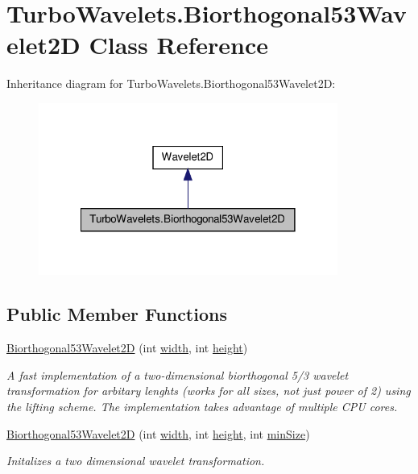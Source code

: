 \hypertarget{class_turbo_wavelets_1_1_biorthogonal53_wavelet2_d}{\section{\-Turbo\-Wavelets.\-Biorthogonal53\-Wavelet2\-D \-Class \-Reference}
\label{class_turbo_wavelets_1_1_biorthogonal53_wavelet2_d}
}


\-Inheritance diagram for \-Turbo\-Wavelets.\-Biorthogonal53\-Wavelet2\-D\-:
\nopagebreak
\begin{figure}[H]
\begin{center}
\leavevmode
\includegraphics[width=278pt]{class_turbo_wavelets_1_1_biorthogonal53_wavelet2_d__inherit__graph}
\end{center}
\end{figure}
\subsection*{\-Public \-Member \-Functions}
\begin{DoxyCompactItemize}
\item 
\hyperlink{class_turbo_wavelets_1_1_biorthogonal53_wavelet2_d_a8783eb5b8e032cd8cf75c5a1bb80bba0}{\-Biorthogonal53\-Wavelet2\-D} (int \hyperlink{class_turbo_wavelets_1_1_wavelet2_d_aaa4b3711957fe1798980e6891331a08d}{width}, int \hyperlink{class_turbo_wavelets_1_1_wavelet2_d_afb2aa87b89b82f329357cbdc0cde18a8}{height})
\begin{DoxyCompactList}\small\item\em \-A fast implementation of a two-\/dimensional biorthogonal 5/3 wavelet transformation for arbitary lenghts (works for all sizes, not just power of 2) using the lifting scheme. \-The implementation takes advantage of multiple \-C\-P\-U cores. \end{DoxyCompactList}\item 
\hyperlink{class_turbo_wavelets_1_1_biorthogonal53_wavelet2_d_a2d9bf97c2211d5859b3a53835bea7888}{\-Biorthogonal53\-Wavelet2\-D} (int \hyperlink{class_turbo_wavelets_1_1_wavelet2_d_aaa4b3711957fe1798980e6891331a08d}{width}, int \hyperlink{class_turbo_wavelets_1_1_wavelet2_d_afb2aa87b89b82f329357cbdc0cde18a8}{height}, int \hyperlink{class_turbo_wavelets_1_1_wavelet2_d_af5148ef1a46dd5694ccea13aa8f1b9e2}{min\-Size})
\begin{DoxyCompactList}\small\item\em \-Initalizes a two dimensional wavelet transformation. \end{DoxyCompactList}\end{DoxyCompactItemize}
